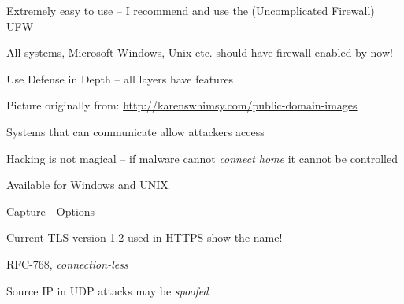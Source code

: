 \documentclass[Screen16to9,17pt]{foils}
\begin{document}
\begin{list2}
\item Extremely easy to use -- I recommend and use the (Uncomplicated Firewall) UFW
\item All systems, Microsoft Windows, Unix etc. should have firewall enabled by now!
\end{list2}



\centerline{Use Defense in Depth -- all layers have features}


\centerline{Picture originally from: \url{http://karenswhimsy.com/public-domain-images}}





Systems that can communicate allow attackers access

Hacking is not magical -- if malware cannot \emph{connect home} it cannot be controlled



\centerline{}
\centerline{Available for Windows and UNIX}



\centerline{Capture - Options}



\centerline{Current TLS version 1.2 used in HTTPS show the name!}


\begin{list1}
\item RFC-768, \emph{connection-less}
\item Source IP in UDP attacks may be \emph{spoofed}
\end{list1}

\end{document}
